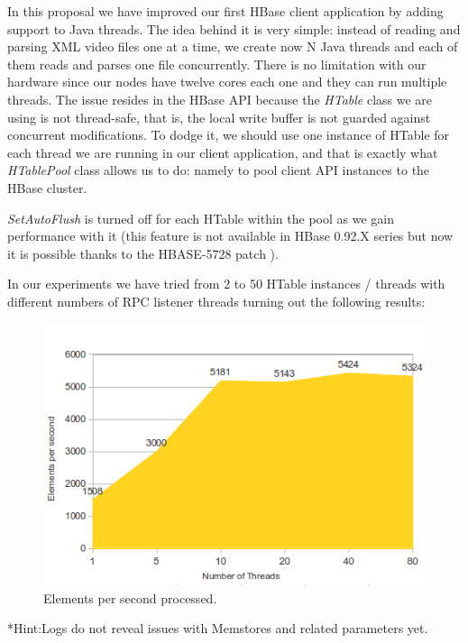 In this proposal we have improved our first HBase client application by adding support to Java threads. The idea behind it is very simple: instead of reading and parsing XML video files one at a time, we create now N Java threads and each of them reads and parses one file concurrently. There is no limitation with our hardware since our nodes have twelve cores each one and they can run multiple threads. The issue resides in the HBase API because the \textit{HTable} class we are using is not thread-safe, that is, the local write buffer is not guarded against concurrent modifications. To dodge it, we should use one instance of HTable for each thread we are running in our client application, and that is exactly what \textit{HTablePool} class allows us to do: namely to pool client API instances to the HBase cluster.
\par
\textit{SetAutoFlush} is turned off for each HTable within the pool as we gain performance with it (this feature is not available in HBase 0.92.X series but now it is possible thanks to the HBASE-5728 patch \cite{HBase5728}). 
\par
 In our experiments we have tried from 2 to 50 HTable instances / threads with different numbers of RPC listener threads turning out the following results:


\begin{figure}[htb]
\centering
\includegraphics[width=1\textwidth]{./images/threadsworking.png}
\caption{Elements per second processed.} \label{fig:threadsworking}
\end{figure}




*Hint:Logs do not reveal issues with Memstores and related parameters yet.

